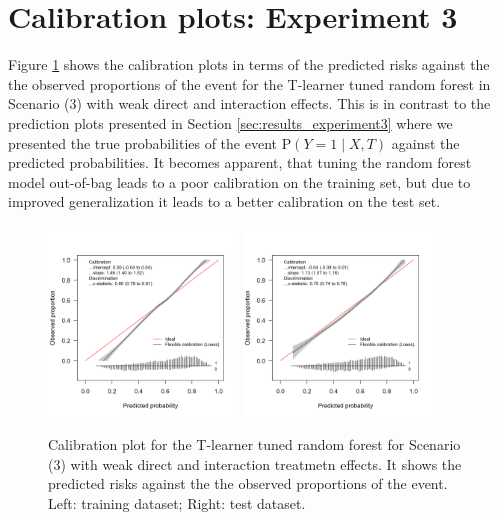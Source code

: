 \clearpage


\section{Calibration plots: Experiment 3} \label{sec:calibration_tuned_rf}

Figure \ref{fig:calibration_tuned_rf} shows the calibration plots in terms of the predicted risks against the the observed proportions of the event for the T-learner tuned random forest in Scenario (3) with weak direct and interaction effects. This is in contrast to the prediction plots presented in Section \ref{sec:results_experiment3} where we presented the true probabilities of the event $\text{P}(Y=1 \mid X, T)$ against the predicted probabilities. It becomes apparent, that tuning the random forest model out-of-bag leads to a poor calibration on the training set, but due to improved generalization it leads to a better calibration on the test set.

\begin{figure}[htbp]
\centering
\includegraphics[width=0.45\textwidth]{img/results_ITE_simulation/small_interaction_tuned_rf_tlearnertrain_calibration_plot.png}
\includegraphics[width=0.45\textwidth]{img/results_ITE_simulation/small_interaction_tuned_rf_tlearnertest_calibration_plot.png}
\caption{Calibration plot for the T-learner tuned random forest for Scenario (3) with weak direct and interaction treatmetn effects. It shows the predicted risks against the the observed proportions of the event. Left: training dataset; Right: test dataset.}
\label{fig:calibration_tuned_rf}
\end{figure}


